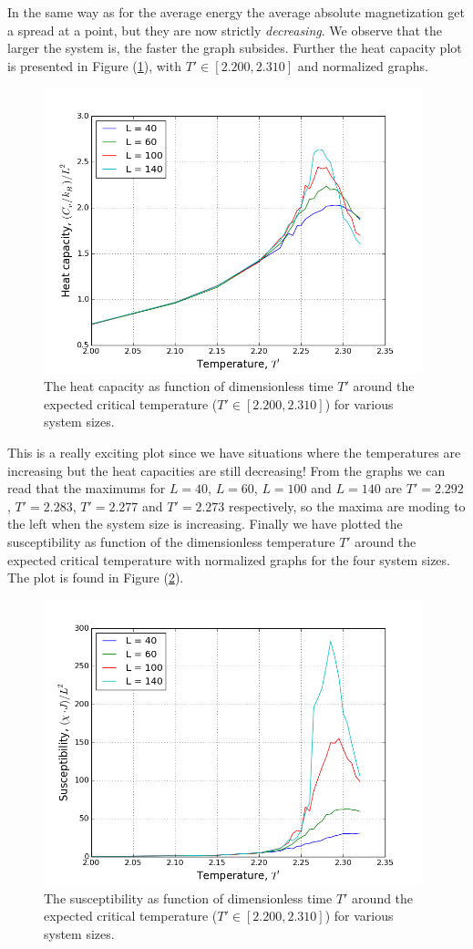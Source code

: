 \documentclass[norsk,a4paper,12pt]{article}
\begin{document}
In the same way as for the average energy the average absolute magnetization get a spread at a point, but they are now strictly \textit{decreasing}. We observe that the larger the system is, the faster the graph subsides. Further the heat capacity plot is presented in Figure (\ref{4e_heat}), with $T'\in[2.200,2.310]$ and normalized graphs.
\begin{figure}[H]
\centering
\includegraphics[width=110mm]{plot_4e_heat.png}
\caption{The heat capacity as function of dimensionless time $T'$ around the expected critical temperature ($T'\in[2.200,2.310]$) for various system sizes. \label{4e_heat}}
\end{figure}
This is a really exciting plot since we have situations where the temperatures are increasing but the heat capacities are still decreasing! From the graphs we can read that the maximums for $L=40$, $L=60$, $L=100$ and $L=140$ are $T'=2.292$, $T'=2.283$, $T'=2.277$ and $T'=2.273$ respectively, so the maxima are moding to the left when the system size is increasing. Finally we have plotted the susceptibility as function of the dimensionless temperature $T'$ around the expected critical temperature with normalized graphs for the four system sizes. The plot is found in Figure (\ref{4e_X}).
\begin{figure}[H]
\centering
\includegraphics[width=110mm]{plot_4e_X.png}
\caption{The susceptibility as function of dimensionless time $T'$ around the expected critical temperature ($T'\in[2.200,2.310]$) for various system sizes. \label{4e_X}}
\end{figure}
\end{document}
